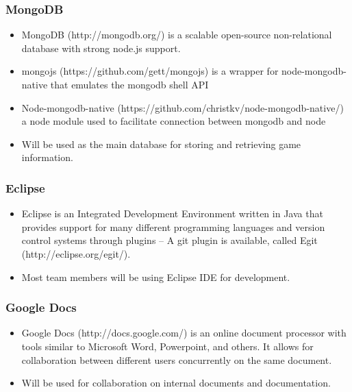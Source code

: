 \documentclass[letterpaper,12pt]{article}
\begin{document}
\subsubsection{MongoDB}
	\begin{itemize}
		\item MongoDB (http://mongodb.org/) is a scalable open-source non-relational database with strong node.js support.
		\item mongojs (https://github.com/gett/mongojs) is a wrapper for node-mongodb-native that emulates the mongodb shell API
		\item Node-mongodb-native (https://github.com/christkv/node-mongodb-native/) a node module used to facilitate connection between mongodb and node
		\item Will be used as the main database for storing and retrieving game information.
	\end{itemize}

\subsubsection{Eclipse}
	\begin{itemize}
		\item Eclipse is an Integrated Development Environment written in Java that provides support for many different programming languages and version control systems through plugins -- A git plugin is available, called Egit (http://eclipse.org/egit/).
		\item Most team members will be using Eclipse IDE for development.
	\end{itemize}
\subsubsection{Google Docs}
	\begin{itemize}
		\item Google Docs (http://docs.google.com/) is an online document processor with tools similar to Microsoft Word, Powerpoint, and others. It allows for collaboration between different users concurrently on the same document.
		\item Will be used for collaboration on internal documents and documentation.
	\end{itemize}
\end{document}
